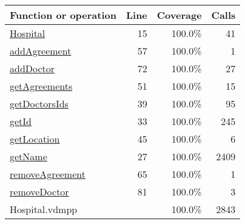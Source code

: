 \bigskip
\begin{longtable}{|l|r|r|r|}
\hline
Function or operation & Line & Coverage & Calls \\
\hline
\hline
\hyperref[Hospital:15]{Hospital} & 15&100.0\% & 41 \\
\hline
\hyperref[addAgreement:57]{addAgreement} & 57&100.0\% & 1 \\
\hline
\hyperref[addDoctor:72]{addDoctor} & 72&100.0\% & 27 \\
\hline
\hyperref[getAgreements:51]{getAgreements} & 51&100.0\% & 15 \\
\hline
\hyperref[getDoctorsIds:39]{getDoctorsIds} & 39&100.0\% & 95 \\
\hline
\hyperref[getId:33]{getId} & 33&100.0\% & 245 \\
\hline
\hyperref[getLocation:45]{getLocation} & 45&100.0\% & 6 \\
\hline
\hyperref[getName:27]{getName} & 27&100.0\% & 2409 \\
\hline
\hyperref[removeAgreement:65]{removeAgreement} & 65&100.0\% & 1 \\
\hline
\hyperref[removeDoctor:81]{removeDoctor} & 81&100.0\% & 3 \\
\hline
\hline
Hospital.vdmpp & & 100.0\% & 2843 \\
\hline
\end{longtable}

